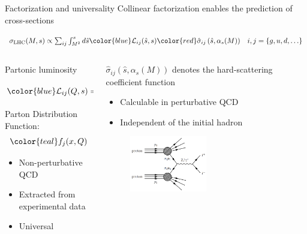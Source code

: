 \documentclass[aspectratio=169, 8pt,t]{beamer}
\begin{document}
\begin{frame}{Factorization and universality}
  Collinear factorization enables the prediction of cross-sections

  \vspace*{0.5em}
  $
  \sigma_{\mathrm{LHC}}(M, s) \propto \sum_{i j} \int_{M^2}^s d \hat{s} {\color{blue}\mathcal{L}_{i j}(\hat{s}, s)} {\color{red}\hat{\sigma}_{i j}\left(\hat{s}, \alpha_s(M)\right)} \quad i,j = \{g, u, d, \ldots\}
  $

  \vspace*{3em}

  \begin{columns}
    \begin{column}{0.49\textwidth}
      Partonic luminosity
      \begin{equation*}
        {\color{blue}\mathcal{L}_{i j}(Q, s)}=\frac{1}{s} \int_{Q^2 / s}^1 \frac{d x}{x} {\color{teal}f_i\left(\frac{Q^2}{s x}, Q\right) f_j(x, Q)}
      \end{equation*}
      Parton Distribution Function:
      \begin{equation*}
        {\color{teal} f_j(x,Q)}
      \end{equation*}
      \begin{itemize}
        \item Non-perturbative QCD
        \item Extracted from experimental data
        \item Universal
      \end{itemize}
    \end{column}

    \begin{column}{0.49\textwidth}

      \vspace*{1em}
      {\color{red} $\hat{\sigma}_{i j}\left(\hat{s}, \alpha_s(M)\right)$} denotes the hard-scattering coefficient function
      \begin{itemize}
        \item Calculable in perturbative QCD
        \item Independent of the initial hadron
      \end{itemize}
      \vspace*{-5cm}
      \begin{figure}
        \includegraphics[width=0.5\textwidth]{figures/dy.png}
      \end{figure}
    \end{column}
  \end{columns}
\end{frame}
\end{document}
